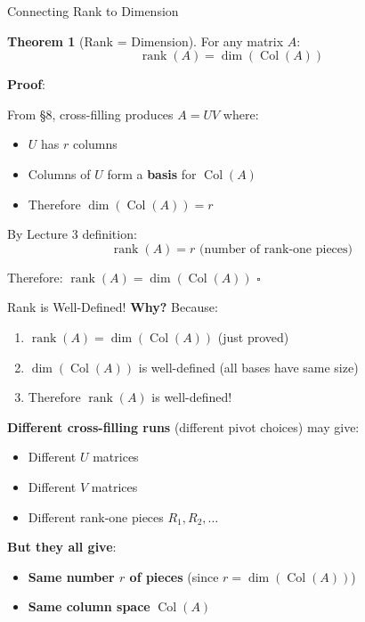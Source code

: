 \documentclass[10pt]{beamer}
\theoremstyle{definition}
\newtheorem{thm}{Theorem}[section]
\newcommand{\x}[1]{\alert{\textbf{#1}}}
\begin{document}
\begin{frame}{Connecting Rank to Dimension}
\begin{thm}[Rank = Dimension]
For any matrix $A$:
$$\operatorname{rank}(A) = \dim(\operatorname{Col}(A))$$
\end{thm}

\vfill
\textbf{Proof}:

From §8, cross-filling produces $A = UV$ where:
\begin{itemize}
\item $U$ has $r$ columns
\item Columns of $U$ form a \x{basis} for $\operatorname{Col}(A)$
\item Therefore $\dim(\operatorname{Col}(A)) = r$
\end{itemize}

\vfill
By Lecture 3 definition:
$$\operatorname{rank}(A) = r \text{ (number of rank-one pieces)}$$

\vfill
Therefore: $\operatorname{rank}(A) = \dim(\operatorname{Col}(A))$ $\square$
\end{frame}

\begin{frame}{Rank is Well-Defined!}
\x{Why?} Because:
\begin{enumerate}
\item $\operatorname{rank}(A) = \dim(\operatorname{Col}(A))$ (just proved)
\item $\dim(\operatorname{Col}(A))$ is well-defined (all bases have same size)
\item Therefore $\operatorname{rank}(A)$ is well-defined!
\end{enumerate}

\vfill
\x{Different cross-filling runs} (different pivot choices) may give:
\begin{itemize}
\item Different $U$ matrices
\item Different $V$ matrices
\item Different rank-one pieces $R_1, R_2, \ldots$
\end{itemize}

\vfill
\x{But they all give}:
\begin{itemize}
\item \x{Same number $r$ of pieces} (since $r = \dim(\operatorname{Col}(A))$)
\item \x{Same column space} $\operatorname{Col}(A)$
\end{itemize}
\end{frame}
\end{document}
